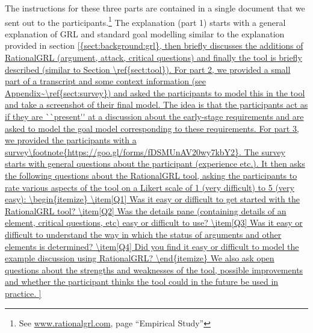 The instructions for these three parts are contained in a single document that we sent out to the participants.\footnote{See \url{www.rationalgrl.com}, page ``Empirical Study''} The explanation (part 1) starts with a general explanation of GRL and standard goal modelling similar to the explanation provided in section \ref{{sect:background:grl}, then briefly discusses the additions of RationalGRL (argument, attack, critical questions) and finally the tool is briefly described (similar to Section \ref{sect:tool}). 

For part 2, we provided a small part of a transcript and some context information (see Appendix~\ref{sect:survey}) and asked the participants to model this in the tool and take a screenshot of their final model. The idea is that the participants act as if they are ``present'' at a discussion about the early-stage requirements and are asked to model the goal model corresponding to these requirements. 

For part 3, we provided the participants with a survey\footnote{https://goo.gl/forms/fDSMUnAV20wy7kbY2}. The survey starts with general questions about the participant (experience etc.). It then asks the following questions about the RationalGRL tool, asking the participants to rate various aspects of the tool on a Likert scale of 1 (very difficult) to 5 (very easy):
\begin{itemize}
\item[Q1] Was it easy or difficult to get started with the RationalGRL tool?
\item[Q2] Was the details pane (containing details of an element, critical questions, etc) easy or difficult to use?
\item[Q3] Was it easy or difficult to understand the way in which the status of arguments and other elements is determined?
\item[Q4] Did you find it easy or difficult to model the example discussion using RationalGRL?
\end{itemize}
We also ask open questions about the strengths and weaknesses of the tool, possible improvements and whether the participant thinks the tool could in the future be used in practice.

}
